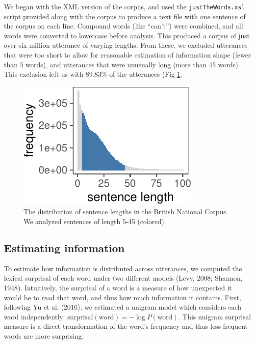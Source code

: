 \documentclass[10pt, letterpaper]{article}
\newenvironment{CodeChunk}{}{}
\begin{document}
We began with the XML version of the corpus, and used the
\texttt{justTheWords.xsl} script provided along with the corpus to
produce a text file with one sentence of the corpus on each line.
Compound words (like ``can't'') were combined, and all words were
converted to lowercase before analysis. This produced a corpus of just
over six million utterance of varying lengths. From these, we excluded
utterances that were too short to allow for reasonable estimation of
information shape (fewer than 5 words), and utterances that were
unusually long (more than 45 words). This exclusion left us with 89.83\%
of the utterances (Fig \ref{fig:bnc-lengths}.

\begin{CodeChunk}
\begin{figure}[tb]

{\centering \includegraphics{figs/bnc-lengths-1} 

}

\caption[The distribution of sentence lengths in the British National Corpus]{The distribution of sentence lengths in the British National Corpus. We analyzed sentences of length 5-45 (colored).}\label{fig:bnc-lengths}
\end{figure}
\end{CodeChunk}

\hypertarget{estimating-information}{%
\subsection{Estimating information}\label{estimating-information}}

To estimate how information is distributed across utterances, we
computed the lexical surprisal of each word under two different models
(Levy, 2008; Shannon, 1948). Intuitively, the surprisal of a word is a
measure of how unexpected it would be to read that word, and thus how
much information it contains. First, following Yu et al. (2016), we
estimated a unigram model which considers each word independently:
\(\text{surprisal}(\text{word}) = -\log P(\text{word})\). This unigram
surprisal measure is a direct transformation of the word's frequency and
thus less frequent words are more surprising.
\end{document}
